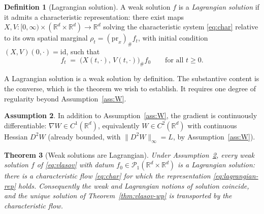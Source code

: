 \documentclass[11pt]{article}
\newtheorem{theorem}{Theorem}
\theoremstyle{definition}
\newtheorem{definition}[theorem]{Definition}
\newtheorem{assumption}[theorem]{Assumption}
\theoremstyle{remark}
\newcommand{\R}{\mathbb{R}}
\begin{document}
\begin{definition}[Lagrangian solution]\label{def:lagrangian-sol}
A weak solution $f$ is a \emph{Lagrangian solution} if it admits a characteristic
representation: there exist maps $X, V : [0,\infty) \times (\R^d \times \R^d) \to \R^d$
solving the characteristic system \eqref{eq:char} relative to its own spatial marginal
$\rho_t = (\mathrm{pr}_x)_\# f_t$, with initial condition $(X,V)(0,\cdot) = \mathrm{id}$,
such that
\begin{equation}
  f_t \;=\; \big( X(t,\cdot),\, V(t,\cdot) \big)_\# f_0
  \qquad \text{for all } t \ge 0.
  \label{eq:lagrangian-rep}
\end{equation}
\end{definition}

A Lagrangian solution is a weak solution by definition. The substantive content is
the converse, which is the theorem we wish to establish. It requires one degree of
regularity beyond Assumption~\ref{ass:W}.

\begin{assumption}\label{ass:W2}
In addition to Assumption~\ref{ass:W}, the gradient is continuously differentiable:
$\nabla W \in C^1(\R^d)$, equivalently $W \in C^2(\R^d)$ with continuous Hessian
$D^2 W$ (already bounded, with $\|D^2 W\|_\infty = L$, by Assumption~\ref{ass:W}).
\end{assumption}

\begin{theorem}[Weak solutions are Lagrangian]\label{thm:weak-lagrangian}
Under Assumption~\ref{ass:W2}, every weak solution $f$ of \eqref{eq:vlasov} with datum
$f_0 \in \mathcal{P}_1(\R^d \times \R^d)$ is a Lagrangian solution: there is a characteristic
flow \eqref{eq:char} for which the representation \eqref{eq:lagrangian-rep} holds.
Consequently the weak and Lagrangian notions of solution coincide, and the unique
solution of Theorem~\ref{thm:vlasov-wp} is transported by the characteristic flow.
\end{theorem}
\end{document}
